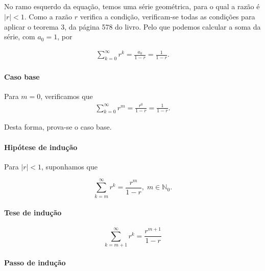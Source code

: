 \subsection{}

\paragraph{} No ramo esquerdo da equação, temos uma série
geométrica, para o qual a razão é $|r| < 1$. Como a razão $r$ verifica a
condição, verificam-se todas as condições para aplicar o teorema 3, da página
578 do livro\cite{santos2016calculo}.
Pelo que podemos calcular a soma da série, com $a_0 = 1$, por

\begin{align*}
	\sum^{\infty}_{k = 0} r^k = \frac{a_0}{1 - r} = \frac{1}{1 - r}.
\end{align*}

\paragraph{Caso base}


Para $m = 0$, verificamos que
\begin{align*}
	\sum^{\infty}_{k=0} r^m = \frac{r^0}{1 - r} = \frac{1}{1 - r}.
\end{align*}

Desta forma, prova-se o caso base.

\paragraph{Hipótese de indução} Para $|r| < 1$, suponhamos que

\begin{equation}
\label{eqn:ex1-hipotese}
	\sum^{\infty}_{k=m} r^k = \frac{r^m}{1 - r}, \; m \in \mathbb{N}_{0}.
\end{equation}

\paragraph{Tese de indução}

\begin{equation}
\label{eqn:ex1-tese}
	\sum^{\infty}_{k=m+1} r^k = \frac{r^{m + 1}}{1 - r}
\end{equation}

\newpage

\paragraph{Passo de indução}

